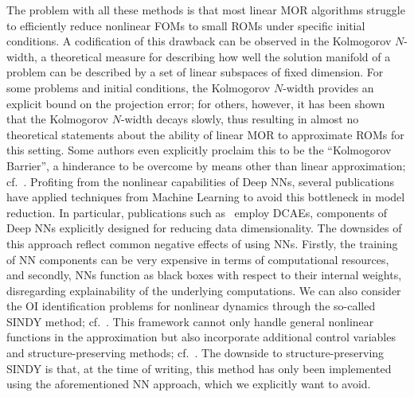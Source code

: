 The problem with all these methods is that most linear MOR algorithms struggle to efficiently reduce nonlinear \acp{FOM} to small \acp{ROM} under specific initial conditions.
A codification of this drawback can be observed in the Kolmogorov $N$-width, a theoretical measure for describing how well the solution manifold of a problem can be described by a set of linear subspaces of fixed dimension.
For some problems and initial conditions, the Kolmogorov $N$-width provides an explicit bound on the projection error; for others, however, it has been shown that the Kolmogorov $N$-width decays slowly, thus resulting in almost no theoretical statements about the ability of linear \ac{MOR} to approximate \acp{ROM} for this setting.
Some authors even explicitly proclaim this to be the ``Kolmogorov Barrier'', a hinderance to be overcome by means other than linear approximation; cf.~\cite{Barnett2022}.
Profiting from the nonlinear capabilities of Deep \acfp{NN}, several publications have applied techniques from Machine Learning to avoid this bottleneck in model reduction.
In particular, publications such as~\cite{Lee2020, Benner2022, Romor2023, Buchfink2023} employ \acp{DCAE}, components of Deep \acp{NN} explicitly designed for reducing data dimensionality.
The downsides of this approach reflect common negative effects of using \acp{NN}.
Firstly, the training of \ac{NN} components can be very expensive in terms of computational resources, and secondly, \acp{NN} function as black boxes with respect to their internal weights, disregarding explainability of the underlying computations.
We can also consider the \ac{OI} identification problems for nonlinear dynamics through the so-called \acs{SINDY} method; cf.~\cite{Brunton2016, Kaheman2020}.
This framework cannot only handle general nonlinear functions in the approximation but also incorporate additional control variables and structure-preserving methods; cf.~\cite{Kaiser2018, Lee2022}.
The downside to structure-preserving \acs{SINDY} is that, at the time of writing, this method has only been implemented using the aforementioned \ac{NN} approach, which we explicitly want to avoid.


